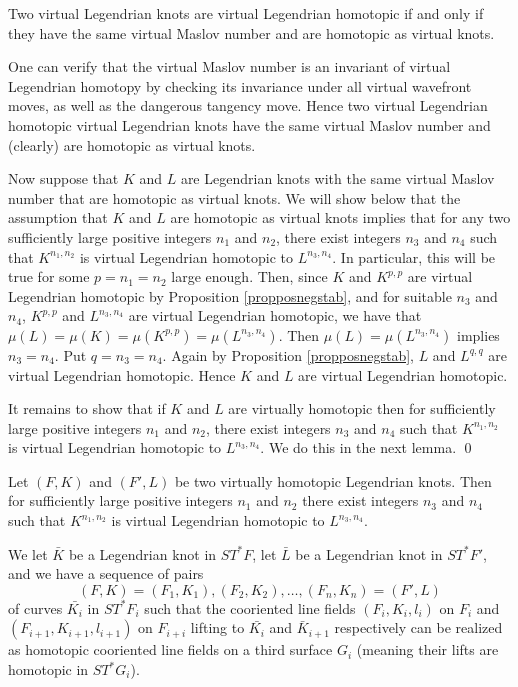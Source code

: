 \begin{thm} Two virtual Legendrian knots are virtual Legendrian homotopic if and only if they have the same virtual Maslov number and are homotopic as virtual knots.
\end{thm}
\pp One can verify that the virtual Maslov number is an invariant of virtual Legendrian homotopy by checking its invariance under all virtual wavefront moves, as well as the dangerous tangency move.  Hence two virtual Legendrian homotopic virtual Legendrian knots have the same virtual Maslov number and (clearly) are homotopic as virtual knots.

Now suppose that $K$ and $L$ are Legendrian knots with the same virtual Maslov number that are homotopic as virtual knots.  We will show below that the assumption that $K$ and $L$ are homotopic as virtual knots implies that for any two sufficiently large positive integers $n_1$ and $n_2$, there exist integers $n_3$ and $n_4$ such that $K^{n_1, n_2}$ is virtual Legendrian homotopic to $L^{n_3,n_4}$.  In particular, this will be true for some $p=n_1=n_2$ large enough.  Then, since $K$ and $K^{p,p}$ are virtual Legendrian homotopic by Proposition \ref{propposnegstab}, and for suitable $n_3$ and $n_4$, $K^{p,p}$ and $L^{n_3,n_4}$ are virtual Legendrian homotopic, we have that $\mu(L)=\mu(K)=\mu(K^{p,p})=\mu(L^{n_3,n_4})$.  Then $\mu(L)=\mu(L^{n_3,n_4})$ implies $n_3=n_4$.  Put $q=n_3=n_4$.  Again by Proposition \ref{propposnegstab}, $L$ and $L^{q,q}$ are virtual Legendrian homotopic. Hence $K$ and $L$ are virtual Legendrian homotopic.

It remains to show that if $K$ and $L$ are virtually homotopic then for sufficiently large positive integers $n_1$ and $n_2$, there exist integers $n_3$ and $n_4$ such that $K^{n_1, n_2}$ is virtual Legendrian homotopic to $L^{n_3,n_4}$.  We do this in the next lemma. \qed

\begin{lem} \label{extrazigzaghomotopy} Let $(F,K)$ and $(F',L)$ be two virtually homotopic Legendrian knots.  Then for sufficiently large positive integers $n_1$ and $n_2$ there exist integers $n_3$ and $n_4$ such that $K^{n_1, n_2}$ is virtual Legendrian homotopic to $L^{n_3,n_4}$.
\end{lem}
\pp
We let $\bar{K}$ be a Legendrian knot in $ST^*F$, let $\bar{L}$ be a Legendrian knot in $ST^*F'$, and we have a sequence of pairs $$(F,K)=(F_1,K_1),(F_2,K_2),\dots,(F_n,K_n)=(F',L)$$ of curves $\bar{K_i}$ in $ST^*F_i$ such that the cooriented line fields $(F_i, K_i, l_i)$ on $F_i$ and $(F_{i+1}, K_{i+1}, l_{i+1})$ on $F_{i+i}$ lifting to $\bar{K_i}$ and $\bar{K}_{i+1}$ respectively can be realized as homotopic cooriented line fields on a third surface $G_i$ (meaning their lifts are homotopic in $ST^*G_i$).  

